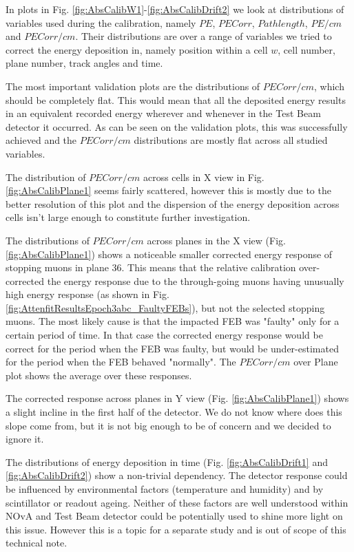 In plots in Fig. \ref{fig:AbsCalibW1}-\ref{fig:AbsCalibDrift2} we look at distributions of variables used during the calibration, namely $PE$, $PECorr$, $Pathlength$, $PE/cm$ and $PECorr/cm$. Their distributions are over a range of variables we tried to correct the energy deposition in, namely position within a cell $w$, cell number, plane number, track angles and time.

The most important validation plots are the distributions of $PECorr/cm$, which should be completely flat. This would mean that all the deposited energy results in an equivalent recorded energy wherever and whenever in the Test Beam detector it occurred. As can be seen on the validation plots, this was successfully achieved and the $PECorr/cm$ distributions are mostly flat across all studied variables.

The distribution of $PECorr/cm$ across cells in X view in Fig. \ref{fig:AbsCalibPlane1} seems fairly scattered, however this is mostly due to the better resolution of this plot and the dispersion of the energy deposition across cells isn't large enough to constitute further investigation.

The distributions of $PECorr/cm$ across planes in the X view (Fig. \ref{fig:AbsCalibPlane1}) shows a noticeable smaller corrected energy response of stopping muons in plane 36. This means that the relative calibration over-corrected the energy response due to the through-going muons having unusually high energy response (as shown in Fig. \ref{fig:AttenfitResultsEpoch3abc_FaultyFEBs}), but not the selected stopping muons. The most likely cause is that the impacted FEB was "faulty" only for a certain period of time. In that case the corrected energy response would be correct for the period when the FEB was faulty, but would be under-estimated for the period when the FEB behaved "normally". The $PECorr/cm$ over Plane plot shows the average over these responses.

The corrected response across planes in Y view (Fig. \ref{fig:AbsCalibPlane1}) shows a slight incline in the first half of the detector. We do not know where does this slope come from, but it is not big enough to be of concern and we decided to ignore it.

The distributions of energy deposition in time (Fig. \ref{fig:AbsCalibDrift1} and \ref{fig:AbsCalibDrift2}) show a non-trivial dependency. The detector response could be influenced by environmental factors (temperature and humidity) and by scintillator or readout ageing. Neither of these factors are well understood within NOvA and Test Beam detector could be potentially used to shine more light on this issue. However this is a topic for a separate study and is out of scope of this technical note.

